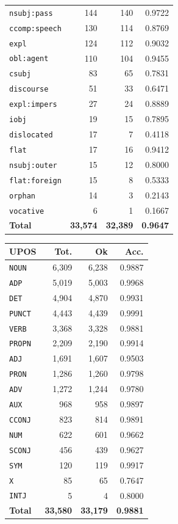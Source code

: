 \begin{table}[ht]
\begin{minipage}[t]{0.55\linewidth}
\begin{tabular}{lrrr}
\texttt{nsubj\!:\!pass} & 144 & 140 & 0.9722 \\
\texttt{ccomp\!:\!speech} & 130 & 114 & 0.8769 \\
\texttt{expl} & 124 & 112 & 0.9032 \\
\texttt{obl\!:\!agent} & 110 & 104 & 0.9455 \\
\texttt{csubj} & 83 & 65 & 0.7831 \\
\texttt{discourse} & 51 & 33 & 0.6471 \\
\texttt{expl\!:\!impers} & 27 & 24 & 0.8889 \\
\texttt{iobj} & 19 & 15 & 0.7895 \\
\texttt{dislocated} & 17 & 7 & 0.4118 \\
\texttt{flat} & 17 & 16 & 0.9412 \\
\texttt{nsubj\!:\!outer} & 15 & 12 & 0.8000 \\
\texttt{flat\!:\!foreign} & 15 & 8 & 0.5333 \\
\texttt{orphan} & 14 & 3 & 0.2143 \\
\texttt{vocative} & 6 & 1 & 0.1667 \\
\midrule
\textbf{Total} & \textbf{33,574} & \textbf{32,389} & \textbf{0.9647} \\
\bottomrule
\end{tabular}
\end{minipage}
\hfill
\begin{minipage}[t]{0.42\linewidth}
\centering\scriptsize
\begin{tabular}{lrrr}
\toprule
\textbf{UPOS} & \textbf{Tot.} & \textbf{Ok} & \textbf{Acc.} \\
\midrule
\texttt{NOUN} & 6,309 & 6,238 & 0.9887 \\
\texttt{ADP} & 5,019 & 5,003 & 0.9968 \\
\texttt{DET} & 4,904 & 4,870 & 0.9931 \\
\texttt{PUNCT} & 4,443 & 4,439 & 0.9991 \\
\texttt{VERB} & 3,368 & 3,328 & 0.9881 \\
\texttt{PROPN} & 2,209 & 2,190 & 0.9914 \\
\texttt{ADJ} & 1,691 & 1,607 & 0.9503 \\
\texttt{PRON} & 1,286 & 1,260 & 0.9798 \\
\texttt{ADV} & 1,272 & 1,244 & 0.9780 \\
\texttt{AUX} & 968 & 958 & 0.9897 \\
\texttt{CCONJ} & 823 & 814 & 0.9891 \\
\texttt{NUM} & 622 & 601 & 0.9662 \\
\texttt{SCONJ} & 456 & 439 & 0.9627 \\
\texttt{SYM} & 120 & 119 & 0.9917 \\
\texttt{X} & 85 & 65 & 0.7647 \\
\texttt{INTJ} & 5 & 4 & 0.8000 \\
\midrule
\textbf{Total} & \textbf{33,580} & \textbf{33,179} & \textbf{0.9881} \\
\bottomrule
\end{tabular}
\end{minipage}
\end{table}
